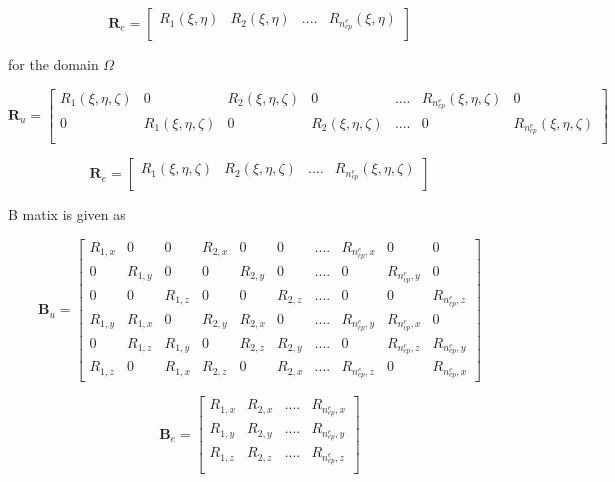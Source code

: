 \documentclass[12pt]{article}
\begin{document}
\begin{equation} \label{RMatrix1}
\textbf{R}_e =
\begin{bmatrix}
R_1(\xi,\eta) & R_2(\xi,\eta) & .... & R_{n_{cp}^e}(\xi,\eta) \\
\end{bmatrix}
\end{equation}

\noindent
for the domain $\Omega$

\begin{equation} \label{RMatrix2}
\textbf{R}_u =
\begin{bmatrix}
R_1(\xi,\eta,\zeta) & 0 & R_2(\xi,\eta,\zeta) &0 & .... & R_{n_{cp}^e}(\xi,\eta,\zeta) & 0 \\
0 &R_1(\xi,\eta,\zeta) & 0 & R_2(\xi,\eta,\zeta) & .... & 0 & R_{n_{cp}^e}(\xi,\eta,\zeta) \\
\end{bmatrix}
\end{equation}

\begin{equation} \label{RMatrix2}
\textbf{R}_e =
\begin{bmatrix}
R_1(\xi,\eta,\zeta) & R_2(\xi,\eta,\zeta) & .... & R_{n_{cp}^e}(\xi,\eta,\zeta) \\
\end{bmatrix}
\end{equation}

\noindent
B matix is given as

\begin{equation} \label{BuMatrix}
\textbf{B}_u =
\begin{bmatrix}
R_{1,x} & 0 & 0 & R_{2,x} & 0 & 0 & .... & R_{n_{cp}^e,x} & 0 & 0 \\
0 &R_{1,y} & 0 & 0 & R_{2,y} & 0 & .... & 0 & R_{n_{cp}^e,y} & 0  \\
0 & 0 & R_{1,z} &0 & 0 & R_{2,z} & .... &0 & 0 & R_{n_{cp}^e,z}  \\
R_{1,y} & R_{1,x} & 0 & R_{2,y} & R_{2,x} & 0 & .... & R_{n_{cp}^e,y} & R_{n_{cp}^e,x} & 0 \\
0 & R_{1,z} & R_{1,y} & 0 & R_{2,z} & R_{2,y} & .... & 0 & R_{n_{cp}^e,z} & R_{n_{cp}^e,y}\\
R_{1,z} &0 & R_{1,x} & R_{2,z} &0 & R_{2,x} & .... &R_{n_{cp}^e,z} &0 &R_{n_{cp}^e,x}
\end{bmatrix}
\end{equation}

\begin{equation} \label{BeMatrix}
\textbf{B}_e =
\begin{bmatrix}
R_{1,x} & R_{2,x} & .... & R_{n_{cp}^e,x} \\
R_{1,y} & R_{2,y} & .... & R_{n_{cp}^e,y} \\
R_{1,z} & R_{2,z} & .... & R_{n_{cp}^e,z} \\
\end{bmatrix}
\end{equation}
\end{document}
